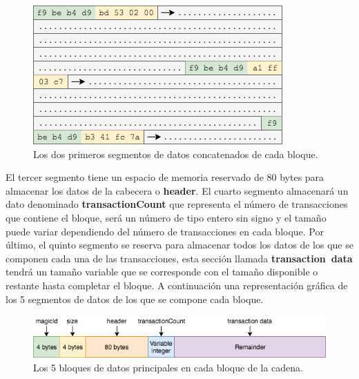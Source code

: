 \documentclass{article}
\begin{document}
    \begin{figure}[H]
    \centering
        \includegraphics[scale=0.61]{img/Bitcoin_SHA_256-Block_delimitadores_de_datos.png}
        \caption{Los dos primeros segmentos de datos concatenados de cada bloque.}
    \end{figure}
    
    El tercer segmento tiene un espacio de memoria reservado de 80 bytes para almacenar los datos de la cabecera o \textbf{header}. El cuarto segmento almacenará un dato denominado \textbf{transactionCount} que representa el número de transacciones que contiene el bloque, será un número de tipo entero sin signo y el tamaño puede variar dependiendo del número de transacciones en cada bloque. Por último, el quinto segmento se reserva para almacenar todos los datos de los que se componen cada una de las transacciones, esta sección llamada \textbf{transaction\ data} tendrá un tamaño variable que se corresponde con el tamaño disponible o restante hasta completar el bloque. A continuación una representación gráfica de los 5 segmentos de datos de los que se compone cada bloque.
    
    \begin{figure}[H]
    \centering
        \includegraphics[scale=0.57]{img/Bitcoin_SHA_256-Block_data}
        \caption{Los 5 bloques de datos principales en cada bloque de la cadena.}
    \end{figure}
    
\end{document}
